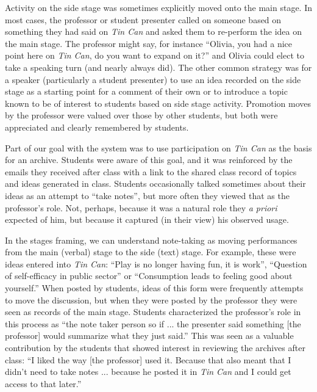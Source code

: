 Activity on the side stage was sometimes explicitly moved onto the main stage. In most cases, the professor or student presenter called on someone based on something they had said on \emph{Tin Can} and asked them to re-perform the idea on the main stage. The professor might say, for instance ``Olivia, you had a nice point here on \emph{Tin Can}, do you want to expand on it?'' and Olivia could elect to take a speaking turn (and nearly always did). The other common strategy was for a speaker (particularly a student presenter) to use an idea recorded on the side stage as a starting point for a comment of their own or to introduce a topic known to be of interest to students based on side stage activity. Promotion moves by the professor were valued over those by other students, but both were appreciated and clearly remembered by students. 

Part of our goal with the system was to use participation on \emph{Tin Can} as the basis for an archive. Students were aware of this goal, and it was reinforced by the emails they received after class with a link to the shared class record of topics and ideas generated in class. Students occasionally talked sometimes about their ideas as an attempt to ``take notes'', but more often they viewed that as the professor's role. Not, perhaps, because it was a natural role they \emph{a priori} expected of him, but because it captured (in their view) his observed usage.

In the stages framing, we can understand note-taking as moving performances from the main (verbal) stage to the side (text) stage. For example, these were ideas entered into \emph{Tin Can}: ``Play is no longer having fun, it is work'', ``Question of self-efficacy in public sector'' or ``Consumption leads to feeling good about yourself.'' When posted by students, ideas of this form were frequently attempts to move the discussion, but when they were posted by the professor they were seen as records of the main stage. Students characterized the professor's role in this process as ``the note taker person so if ... the presenter said something [the professor] would summarize what they just said.'' This was seen as a valuable contribution by the students that showed interest in reviewing the archives after class: ``I liked the way [the professor] used it. Because that also meant that I didn't need to take notes ... because he posted it in \emph{Tin Can} and I could get access to that later.''



